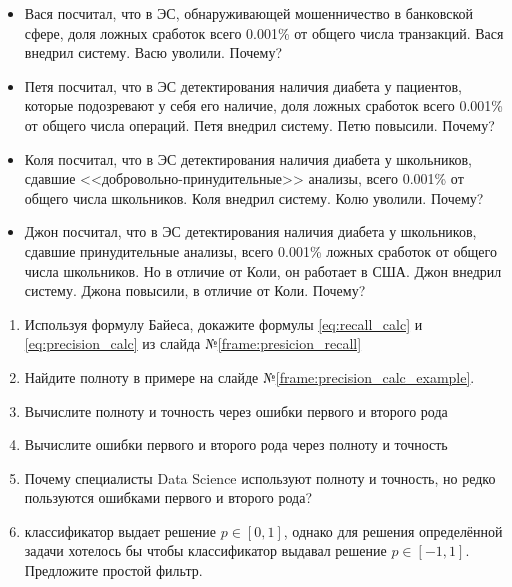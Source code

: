 \documentclass{beamer}
\begin{document}
  \begin{frame}
  \small
  \begin{itemize}
  	\item Вася посчитал, что в ЭС, обнаруживающей мошенничество в банковской сфере,
  	доля ложных сработок всего 0.001\% от общего числа транзакций. 
  	Вася внедрил систему. Васю уволили. Почему?
  	\item Петя посчитал, что в ЭС детектирования наличия диабета у пациентов,
  	которые подозревают у себя его наличие, 
  	доля ложных сработок всего 0.001\% от общего числа операций.
  	Петя внедрил систему. Петю повысили. Почему?
  	\item Коля посчитал, что в ЭС детектирования наличия диабета у 
  	школьников, сдавшие <<добровольно-принудительные>> анализы, 
  	всего 0.001\% от общего числа школьников. Коля внедрил систему. Колю уволили. Почему?
  	\item Джон посчитал, что в ЭС детектирования наличия диабета у 
  	школьников, сдавшие принудительные анализы, 
  	всего 0.001\% ложных сработок от общего числа школьников. 
  	Но в отличие от Коли, он работает в США. 
  	Джон внедрил систему. Джона повысили, в отличие от Коли. Почему?
  \end{itemize}

  \end{frame}
  
  \begin{frame}
  \begin{enumerate}
    \item Используя формулу Байеса, докажите формулы \eqref{eq:recall_calc} и \eqref{eq:precision_calc} из слайда №\ref{frame:presicion_recall}
    \item Найдите полноту в примере на слайде №\ref{frame:precision_calc_example}.
    
     \item Вычислите полноту и точность через ошибки первого и второго рода
  
   \item Вычислите ошибки первого и второго рода через полноту и точность
  
     \item Почему специалисты Data Science используют полноту и точность, 
  но редко пользуются ошибками первого и второго рода?
  
      \item классификатор выдает решение $p \in [0, 1]$, однако для решения
      определённой задачи хотелось бы чтобы классификатор выдавал решение $p \in [-1, 1]$.
      Предложите простой фильтр.
  \end{enumerate}
  
  
\end{frame}

  
\end{document}
